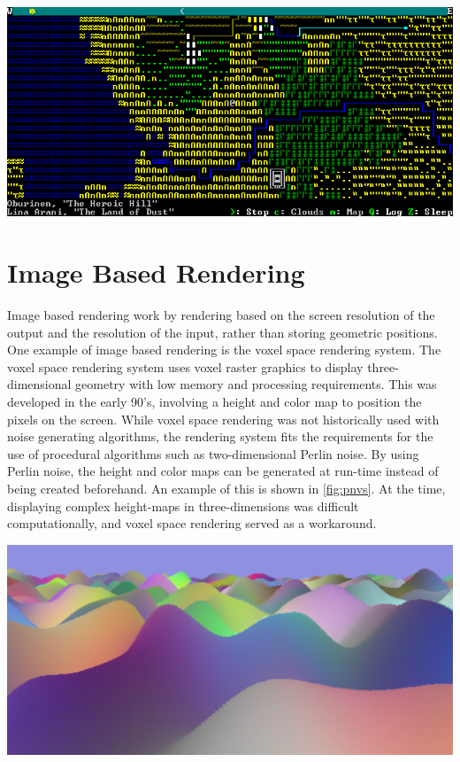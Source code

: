 \documentclass[10pt]{report}
\begin{document}
		\begin{minipage}{\textwidth}
			\centering
			\includegraphics[scale=.5]{dwarf_fortress}
			\label{fig:asciidf}
		\end{minipage}
	
		\section{Image Based Rendering} \label{sec:imagebasedmethods}
		
		Image based rendering work by rendering based on the screen resolution of the output and the resolution of the input, rather than storing geometric positions. One example of image based rendering is the voxel space rendering system. The voxel space rendering system uses voxel raster graphics to display three-dimensional geometry with low memory and processing requirements. This was developed in the early 90's, involving a height and color map to position the pixels on the screen. While voxel space rendering was not historically used with noise generating algorithms, the rendering system fits the requirements for the use of procedural algorithms such as two-dimensional Perlin noise. By using Perlin noise, the height and color maps can be generated at run-time instead of being created beforehand. An example of this is shown in \autoref{fig:pnvs}. At the time, displaying complex height-maps in three-dimensions was difficult computationally, and voxel space rendering served as a workaround. 
		
		\begin{minipage}{\textwidth}
			\centering
			\includegraphics[scale=.15]{proc-voxel}
			\label{fig:pnvs}
		\end{minipage}
		
\end{document}
